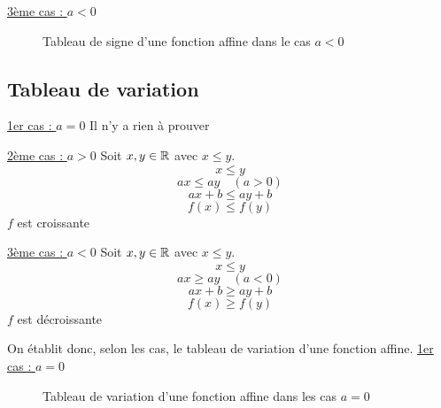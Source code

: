 \underline{3ème cas : $a < 0$}\newline

\begin{figure}[H]
\centering
{}
\caption{Tableau de signe d'une fonction affine dans le cas $a<0$}
\end{figure}
\subsection{Tableau de variation}

\newline
\begin{preuve}
 \underline{1er cas : $a = 0$}\newline
Il n'y a rien à prouver\newline


\underline{2ème cas : $a > 0$}\newline
Soit $x,y \in \mathbb{R}$ avec $x \leq y$.
$$x \leq y$$
$$ax \leq ay \quad (a >0)$$
$$ax + b \leq ay +b$$
$$f(x) \leq f(y)$$
$f$ est croissante\newline


\underline{3ème cas : $a < 0$}\newline
Soit $x,y \in \mathbb{R}$ avec $x \leq y$.
$$x \leq y$$
$$ax \geq ay \quad (a <0)$$
$$ax + b \geq ay +b$$
$$f(x) \geq f(y)$$
$f$ est décroissante
\end{preuve}
On établit donc, selon les cas, le tableau de variation d'une fonction affine. \newline
\underline{1er cas : $a = 0$}\newline

\begin{figure}[H]
\centering
{}
\caption{Tableau de variation d'une fonction affine dans les cas $a=0$}
\end{figure}

